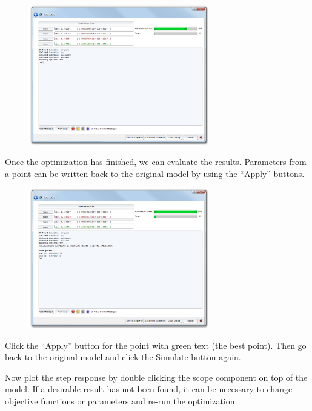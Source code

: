 \documentclass[a4paper,pdftex]{article}
\begin{document}
\begin{tutenumerate}
\FloatBarrier
\begin{figure}[htb]
\center
\includegraphics[width=0.7\textwidth]{gfx/optimization/screenshot-opt5b.png}
\end{figure}
\FloatBarrier

Once the optimization has finished, we can evaluate the results. Parameters from a point can be written back to the original model by using the \enquote{Apply} buttons. 

\FloatBarrier
\begin{figure}[htb]
\center
\includegraphics[width=0.7\textwidth]{gfx/optimization/screenshot-opt5c.png}
\end{figure}
\FloatBarrier

Click the \enquote{Apply} button for the point with green text (the best point). Then go back to the original model and click the Simulate button again.


Now plot the step response by double clicking the scope component on top of the model. If a desirable result has not been found, it can be necessary to change objective functions or parameters and re-run the optimization.

\end{tutenumerate}
\end{document}
